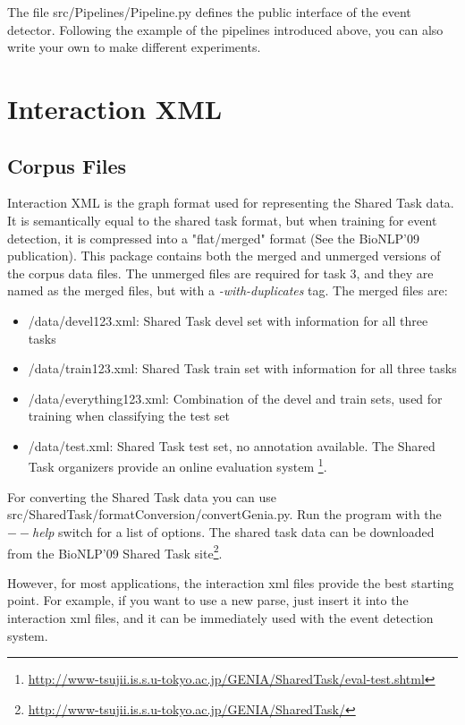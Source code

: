 \documentclass[a4paper,12pt]{article}
\begin{document}
The file src/Pipelines/Pipeline.py defines the public interface of the event
detector. Following the example of the pipelines introduced above, you can
also write your own to make different experiments.

\section{Interaction XML}

\subsection{Corpus Files}

Interaction XML is the graph format used for representing the Shared Task data.
It is semantically equal to the shared task format, but when training for event
detection, it is compressed into a "flat/merged" format (See the BioNLP'09
publication). This package contains both the merged and unmerged versions of
the corpus data files. The unmerged files are required for task 3, and they are
named as the merged files, but with a \emph{-with-duplicates} tag. The merged
files are:

\begin{itemize}
\item /data/devel123.xml: Shared Task devel set with information for all three tasks

\item /data/train123.xml: Shared Task train set with information for all three
tasks 

\item /data/everything123.xml: Combination of the devel and train sets, used
for training when classifying the test set

\item /data/test.xml: Shared Task test set, no annotation available. The Shared
Task organizers provide an online evaluation system
\footnote{\url{http://www-tsujii.is.s.u-tokyo.ac.jp/GENIA/SharedTask/eval-test.shtml}}.

\end{itemize}

For converting the Shared Task data you can use
src/SharedTask/formatConversion/convertGenia.py. Run the program with the
\emph{$--$help} switch for a list of options. The shared task data can be
downloaded from the BioNLP'09 Shared Task
site\footnote{\url{http://www-tsujii.is.s.u-tokyo.ac.jp/GENIA/SharedTask/}}.

However, for most applications, the interaction xml files provide the best
starting point. For example, if you want to use a new parse, just insert it into
the interaction xml files, and it can be immediately used with the event
detection system.
\end{document}

